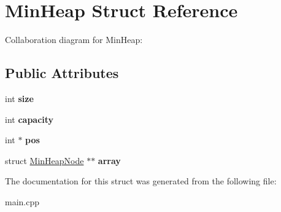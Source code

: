 \hypertarget{struct_min_heap}{}\section{Min\+Heap Struct Reference}
\label{struct_min_heap}


Collaboration diagram for Min\+Heap\+:
\subsection*{Public Attributes}
\begin{DoxyCompactItemize}
\item 
\mbox{\label{struct_min_heap_a656a275b0ca8c80647d6251c09d31247}} 
int {\bfseries size}
\item 
\mbox{\label{struct_min_heap_a88b4aa3e66392a3eabbf2517a9a79a02}} 
int {\bfseries capacity}
\item 
\mbox{\label{struct_min_heap_acc599108d0291df02899573c8d171dac}} 
int $\ast$ {\bfseries pos}
\item 
\mbox{\label{struct_min_heap_a6b7b06e2fcee6b41d3ba7b9929dc8707}} 
struct \hyperlink{struct_min_heap_node}{Min\+Heap\+Node} $\ast$$\ast$ {\bfseries array}
\end{DoxyCompactItemize}


The documentation for this struct was generated from the following file\+:\begin{DoxyCompactItemize}
\item 
main.\+cpp\end{DoxyCompactItemize}
